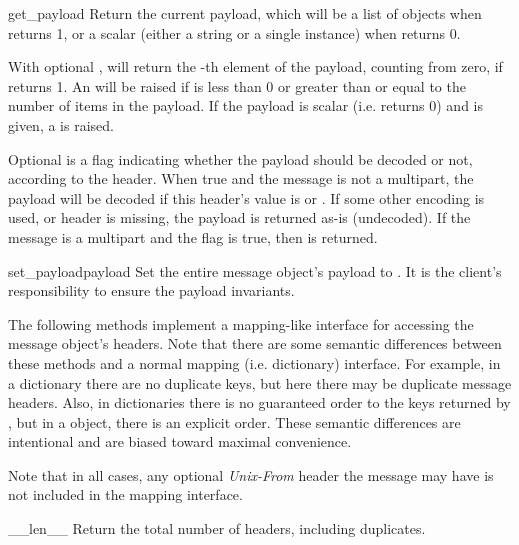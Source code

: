 \begin{methoddesc}[Message]{get_payload}{}
Return the current payload, which will be a list of 
objects when  returns 1, or a scalar (either a
string or a single  instance) when
 returns 0.

With optional ,  will return the
-th element of the payload, counting from zero, if
 returns 1.  An  will be raised
if  is less than 0 or greater than or equal to the number of
items in the payload.  If the payload is scalar
(i.e.  returns 0) and  is given, a
 is raised.

Optional  is a flag indicating whether the payload should be
decoded or not, according to the  header.
When true and the message is not a multipart, the payload will be
decoded if this header's value is  or
.  If some other encoding is used, or
 header is
missing, the payload is returned as-is (undecoded).  If the message is
a multipart and the  flag is true, then  is
returned.
\end{methoddesc}

\begin{methoddesc}[Message]{set_payload}{payload}
Set the entire message object's payload to .  It is the
client's responsibility to ensure the payload invariants.
\end{methoddesc}

The following methods implement a mapping-like interface for accessing
the message object's  headers.  Note that there are some
semantic differences between these methods and a normal mapping
(i.e. dictionary) interface.  For example, in a dictionary there are
no duplicate keys, but here there may be duplicate message headers.  Also,
in dictionaries there is no guaranteed order to the keys returned by
, but in a  object, there is an explicit
order.  These semantic differences are intentional and are biased
toward maximal convenience.

Note that in all cases, any optional \emph{Unix-From} header the message
may have is not included in the mapping interface.

\begin{methoddesc}[Message]{__len__}{}
Return the total number of headers, including duplicates.
\end{methoddesc}


